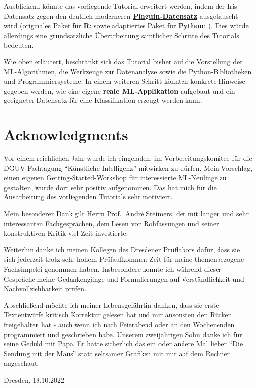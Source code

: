\documentclass [oneside,10pt,a4paper,ngerman,BCOR10mm,headsepline,parindent,final]{scrartcl}
\begin{document}
Ausblickend könnte das vorliegende Tutorial erweitert werden, indem der
Iris-Datensatz gegen den deutlich moderneren
\textbf{\href{https://github.com/mcnakhaee/palmerpenguins}{Pinguin-Datensatz}}
ausgetauscht wird (originales Paket für \textbf{R}:
\cite{palmerpenguins_R_2020} sowie adaptiertes Paket für
\textbf{Python}: \cite{palmerpenguins_Python_2020}). Dies würde
allerdings eine grundsätzliche Überarbeitung sämtlicher Schritte des
Tutorials bedeuten.

Wie oben erläutert, beschränkt sich das Tutorial bisher auf die
Vorstellung der ML-Algorithmen, die Werkzeuge zur Datenanalyse sowie die
Python-Bibliotheken und Programmiersysteme. In einem weiteren Schritt
könnten konkrete Hinweise gegeben werden, wie eine eigene \textbf{reale
ML-Applikation} aufgebaut und ein geeigneter Datensatz für eine
Klassifikation erzeugt werden kann.

    \hypertarget{acknowledgments}{%
\section{Acknowledgments}\label{acknowledgments}}

Vor einem reichlichen Jahr wurde ich eingeladen, im Vorbereitungskomitee
für die DGUV-Fachtagung ``Künstliche Intelligenz'' mitwirken zu dürfen.
Mein Vorschlag, einen eigenen Getting-Started-Workshop für interessierte
ML-Neulinge zu gestalten, wurde dort sehr positiv aufgenommen. Das hat
mich für die Ausarbeitung des vorliegenden Tutorials sehr motiviert.

Mein besonderer Dank gilt Herrn Prof.~André Steimers, der mit langen und
sehr interessanten Fachgesprächen, dem Lesen von Rohfassungen und seiner
konstruktiven Kritik viel Zeit investierte.

Weiterhin danke ich meinen Kollegen des Dresdener Prüflabors dafür, dass
sie sich jederzeit trotz sehr hohem Prüfaufkommen Zeit für meine
themenbezogene Fachsimpelei genommen haben. Insbesondere konnte ich
während dieser Gespräche meine Gedankengänge und Formulierungen auf
Verständlichkeit und Nachvollziehbarkeit prüfen.

Abschließend möchte ich meiner Lebensgefährtin danken, dass sie erste
Textentwürfe kritisch Korrektur gelesen hat und mir ansonsten den Rücken
freigehalten hat - auch wenn ich nach Feierabend oder an den Wochenenden
programmiert und geschrieben habe. Unserem zweijährigen Sohn danke ich
für seine Geduld mit Papa. Er hätte sicherlich das ein oder andere Mal
lieber ``Die Sendung mit der Maus'' statt seltsamer Grafiken mit mir auf
dem Rechner angeschaut.

Dresden, 18.10.2022


    
    
    \printbibheading[heading=bibnumbered]
    \printbibliography[heading=subbibliography,keyword={URL},title={Online references}]
    \printbibliography[heading=subbibliography,keyword={book},title={Books, technical reports and others}]
    
\end{document}
